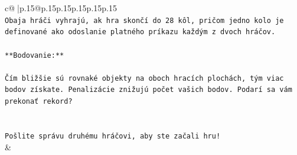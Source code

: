 \documentclass{article}
\begin{document}
{\begin{supertabular}{c@{$\;$}|p{.15\linewidth}@{}p{.15\linewidth}p{.15\linewidth}p{.15\linewidth}p{.15\linewidth}p{.15\linewidth}}
{{{\\ 
\texttt{Obaja hráči vyhrajú, ak hra skončí do 28 kôl, pričom jedno kolo je definované ako odoslanie platného príkazu každým z dvoch hráčov.} \\
\\ 
\texttt{**Bodovanie:**} \\
\\ 
\texttt{Čím bližšie sú rovnaké objekty na oboch hracích plochách, tým viac bodov získate. Penalizácie znižujú počet vašich bodov. Podarí sa vám prekonať rekord?} \\
\\ 
\\ 
\texttt{Pošlite správu druhému hráčovi, aby ste začali hru!} \\
            }
        }
    }
    & \\ \\


\end{supertabular}}
\end{document}
